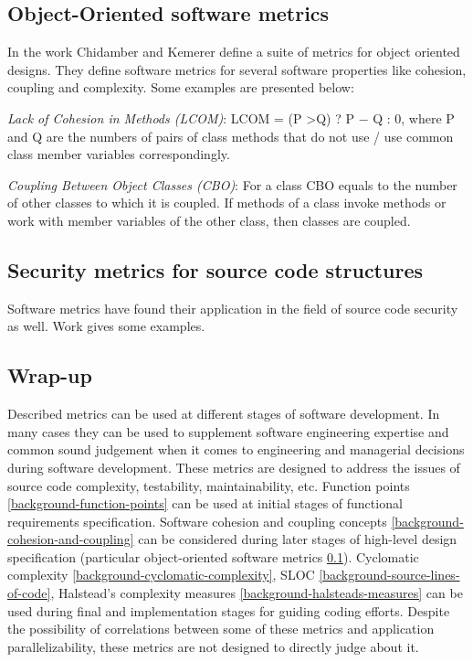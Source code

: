 \subsection{Object-Oriented software metrics}
\label{background-object-oriented-metrics}
\qquad In the work \cite{metrics-object-oriented-paper} Chidamber and Kemerer define a suite of metrics for object oriented designs. They define software metrics for several software properties like cohesion, coupling and complexity. Some examples are presented below:
\begin{description}[align=left,leftmargin=*]
\item\textit{Lack of Cohesion in Methods (LCOM)}:\newline
LCOM = (P \textgreater Q) ? P $-$ Q : 0, where P and Q are the numbers of pairs of class methods that do not use / use common class member variables correspondingly. 
\item\textit{Coupling Between Object Classes (CBO)}:\newline
For a class CBO equals to the number of other classes to which it is coupled. If methods of a class invoke methods or work with member variables of the other class, then classes are coupled.     
\end{description} 

\subsection{Security metrics for source code structures}
\label{background-security-metrics}
\qquad Software metrics have found their application in the field of source code security as well. Work \cite{metrics-security-paper} gives some examples.

\subsection{Wrap-up}
\qquad Described metrics can be used at different stages of software development. In many cases they can be used to supplement software engineering expertise and common sound judgement when it comes to engineering and managerial decisions during software development. These metrics are designed to address the issues of source code complexity, testability, maintainability, etc. Function points \ref{background-function-points} can be used at initial stages of functional requirements specification. Software cohesion and coupling concepts \ref{background-cohesion-and-coupling} can be considered during later stages of high-level design specification (particular object-oriented software metrics \ref{background-object-oriented-metrics}). Cyclomatic complexity \ref{background-cyclomatic-complexity}, SLOC \ref{background-source-lines-of-code}, Halstead's complexity measures \ref{background-halsteads-measures} can be used during final and implementation stages for guiding coding efforts. Despite the possibility of correlations between some of these metrics and application parallelizability, these metrics are not designed to directly judge about it.

